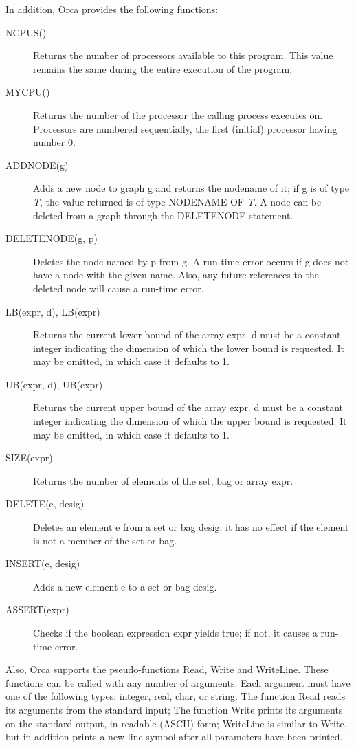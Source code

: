 \documentclass[10pt]{article}
\begin{document}
In addition, Orca provides the following functions:
\begin{description}
\item[NCPUS()]
Returns the number of processors available to this program.
This value remains the same during the entire execution
of the program.
\item[MYCPU()]
Returns the number of the processor the calling process executes on.
Processors are numbered sequentially, the first (initial) processor
having number 0.
\item[ADDNODE(g)]
Adds a new node to graph g and returns the nodename of it;
if g is of type {\em T}, the value returned is of type NODENAME OF {\em T}.
A node can be deleted from a graph through the DELETENODE statement.
\item[DELETENODE(g, p)]
Deletes the node named by p
from g. A run-time error occurs if g does not have a node
with the given name.
Also, any future references to the deleted node will cause a
run-time error.
\item[LB(expr, d), LB(expr)]
Returns the current lower bound of the array expr.
d must be a constant integer indicating the dimension
of which the lower bound is requested. It may be omitted, in which case it
defaults to 1.
\item[UB(expr, d), UB(expr)]
Returns the current upper bound of the array expr.
d must be a constant integer indicating the dimension
of which the upper bound is requested. It may be omitted, in which case it
defaults to 1.
\item[SIZE(expr)]
Returns the number of elements of the set, bag or array expr.
\item[DELETE(e, desig)]
Deletes an element e from a set or bag desig;
it has no effect if the element
is not a member of the set or bag.
\item[INSERT(e, desig)]
Adds a new element e to a set or bag desig.
\item[ASSERT(expr)]
Checks if the boolean expression expr yields true;
if not, it causes a run-time error.
\end{description}

Also, Orca supports the pseudo-functions Read, Write and WriteLine.
These functions can be called with any number of arguments.
Each argument must have one of the following types: integer, real, char,
or string.
The function Read reads its arguments from the standard input;
The function Write prints its arguments on the standard output, in
readable (ASCII) form;
WriteLine is similar to Write, but in addition prints a new-line symbol
after all parameters have been printed.
\end{document}
